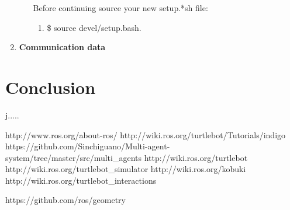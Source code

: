 \documentclass[journal]{IEEEtran}
\begin{document}
\begin{enumerate}
\begin{enumerate}
Before continuing source your new setup.*sh file:
\begin{enumerate}
\item {{\$} source devel/setup.bash}.
\end{enumerate}





\end{enumerate}








\item \textbf {Communication data}




\end{enumerate}






\section{Conclusion}
j.....

























\begin{thebibliography}{1}

http://www.ros.org/about-ros/
http://wiki.ros.org/turtlebot/Tutorials/indigo
https://github.com/Sinchiguano/Multi-agent-system/tree/master/src/multi{\_}agents
http://wiki.ros.org/turtlebot
http://wiki.ros.org/turtlebot{\_}simulator
http://wiki.ros.org/kobuki
http://wiki.ros.org/turtlebot{\_}interactions

https://github.com/ros/geometry


\end{thebibliography}
\end{document}
